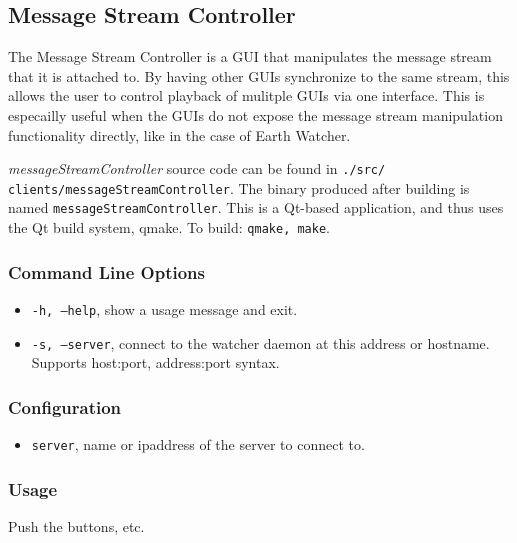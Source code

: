\subsection{Message Stream Controller}
\label{MessageStreamController}

The Message Stream Controller is a GUI that manipulates the message stream that it is attached to. By having other GUIs synchronize
to the same stream, this allows the user to control playback of mulitple GUIs via one interface. This is especailly useful 
when the GUIs do not expose the message stream manipulation functionality directly, like in the case of Earth Watcher. 

{\it messageStreamController} source code can be found in {\tt .\slash src\slash
clients\slash messageStreamController}. The binary produced after building is 
named {\tt messageStreamController}. This is a Qt-based application, and thus uses the Qt build system, qmake. To build: {\tt qmake, make}.

\subsubsection{Command Line Options}
\begin{itemize}
\item {\tt -h, --help}, show a usage message and exit. 
\item {\tt -s, --server}, connect to the watcher daemon at this address or hostname. Supports host:port, address:port syntax.
\end{itemize}

\subsubsection{Configuration}
\begin{itemize}
\item {\tt server}, name or ipaddress of the server to connect to.
\end{itemize}

\subsubsection{Usage}

Push the buttons, etc. 


